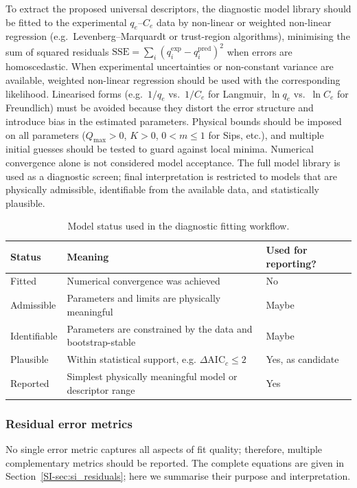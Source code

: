 \documentclass[journal=jacsat,manuscript=article]{achemso}
\begin{document}
	To extract the proposed universal descriptors, the diagnostic model library should be fitted to the experimental $q_e$--$C_e$ data by non-linear or weighted non-linear regression (e.g.\ Levenberg--Marquardt or trust-region algorithms), minimising the sum of squared residuals $\mathrm{SSE} = \sum_i (q_i^{\exp} - q_i^{\mathrm{pred}})^2$ when errors are homoscedastic. When experimental uncertainties or non-constant variance are available, weighted non-linear regression should be used with the corresponding likelihood. Linearised forms (e.g.\ $1/q_e$ vs.\ $1/C_e$ for Langmuir, $\ln q_e$ vs.\ $\ln C_e$ for Freundlich) must be avoided because they distort the error structure and introduce bias in the estimated parameters. Physical bounds should be imposed on all parameters ($Q_{\max} > 0$, $K > 0$, $0 < m \leq 1$ for Sips, etc.), and multiple initial guesses should be tested to guard against local minima.
Numerical convergence alone is not considered model acceptance. The full model library is used as a diagnostic screen; final interpretation is restricted to models that are physically admissible, identifiable from the available data, and statistically plausible.

\begin{table}[H]
\centering
\caption{Model status used in the diagnostic fitting workflow.}
\label{tab:model_status}
\small
\begin{tabular}{lll}
\hline
Status & Meaning & Used for reporting? \\
\hline
Fitted & Numerical convergence was achieved & No \\
Admissible & Parameters and limits are physically meaningful & Maybe \\
Identifiable & Parameters are constrained by the data and bootstrap-stable & Maybe \\
Plausible & Within statistical support, e.g. \(\Delta\mathrm{AIC}_c \leq 2\) & Yes, as candidate \\
Reported & Simplest physically meaningful model or descriptor range & Yes \\
\hline
\end{tabular}
\end{table}

	\subsubsection{Residual error metrics}
	\label{sec:error_metrics}

	No single error metric captures all aspects of fit quality; therefore, multiple complementary metrics should be reported. The complete equations are given in Section~\ref{SI-sec:si_residuals}; here we summarise their purpose and interpretation.
\end{document}
